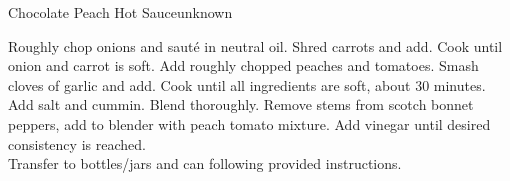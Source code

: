 \begin{recipe}{Chocolate Peach Hot Sauce}{unknown}{}


    Roughly chop onions and sauté in neutral oil. Shred carrots and add. Cook until onion and carrot is soft. Add roughly chopped peaches and tomatoes. Smash cloves of garlic and add. Cook until all ingredients are soft, about 30 minutes. Add salt and cummin. Blend thoroughly. Remove stems from scotch bonnet peppers, add to blender with peach tomato mixture. Add vinegar until desired consistency is reached.\\

    Transfer to bottles/jars and can following provided instructions.
\end{recipe}